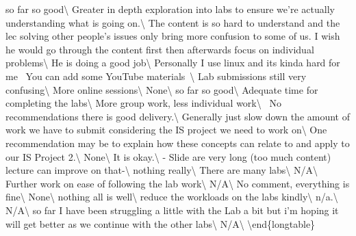 \documentclass[
]{article}
\begin{document}
so far so \vphantom{1} good\textbackslash{} \hline Greater in depth
exploration into labs to ensure we're actually understanding what is
going on.\textbackslash{} \hline The content is so hard to understand
and the lec solving other people's issues only bring more confusion to
some of us. I wish he would go through the content first then afterwards
focus on individual problems\textbackslash{} \hline He is doing a good
job\textbackslash{} \hline Personally I use linux and its kinda hard for
me~ You can add some YouTube materials~\textbackslash{} \hline Lab
submissions still very confusing\textbackslash{} \hline More online
sessions\textbackslash{} \hline None\textbackslash{} \hline so far so
good\textbackslash{} \hline Adequate time for completing the
labs\textbackslash{} \hline More group work, less individual
work\textbackslash{} \hline ~No recommendations there is good
delivery.\textbackslash{} \hline Generally just slow down the amount of
work we have to submit considering the IS project we need to work
on\textbackslash{} \hline One recommendation may be to explain how these
concepts can relate to and apply to our IS Project 2.\textbackslash{}
\hline None\textbackslash{} \hline It is okay.\textbackslash{} \hline -
Slide are very long (too much content) lecture can improve on
that-\textbackslash{} \hline nothing really\textbackslash{} \hline There
are many labs\textbackslash{} \hline N/A\textbackslash{} \hline Further
work on ease of following the lab work\textbackslash{} \hline
N/A\textbackslash{} \hline No comment, everything is
fine\textbackslash{} \hline None\textbackslash{} \hline nothing all is
well\textbackslash{} \hline reduce the workloads on the labs
kindly\textbackslash{} \hline n/a.\textbackslash{} \hline
N/A\textbackslash{} \hline so far I have been struggling a little with
the Lab a bit but i'm hoping it will get better as we continue with the
other labs\textbackslash{} \hline N/A\textbackslash{} \bottomrule
\textbackslash end\{longtable\}
\end{document}
